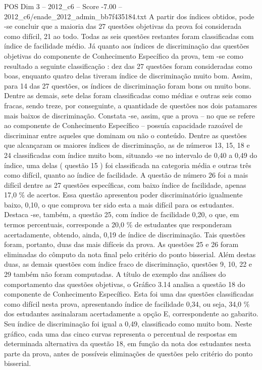 \begin{textsample}{POS Dim 3 – 2012\_c6 – Score -7.00 – 2012\_c6/enade\_2012\_admin\_bb7f435184.txt}
A partir dos índices obtidos, pode -se concluir que a maioria das 27 questões objetivas da prova foi considerada como difícil, 21 ao todo.
Todas as seis questões restantes foram classificadas com índice de facilidade médio.
Já quanto aos índices de discriminação das questões objetivas do componente de Conhecimento Específico da prova, tem -se como resultado a seguinte classificação : dez das 27 questões foram consideradas como boas, enquanto quatro delas tiveram índice de discriminação muito bom.
Assim, para 14 das 27 questões, os índices de discriminação foram bons ou muito bons.
Dentre as demais, sete delas foram classificadas como médias e outras seis como fracas, sendo treze, por conseguinte, a quantidade de questões nos dois patamares mais baixos de discriminação.
Constata -se, assim, que a prova – no que se refere ao componente de Conhecimento Específico – possuía capacidade razoável de discriminar entre aqueles que dominam ou não o conteúdo.
Dentre as questões que alcançaram os maiores índices de discriminação, as de números 13, 15, 18 e 24 classificadas com índice muito bom, situando -se no intervalo de 0,40 a 0,49 do índice, uma delas ( questão 15 ) foi classificada na categoria média e outras três como difícil, quanto ao índice de facilidade.
A questão de número 26 foi a mais difícil dentre as 27 questões específicas, com baixo índice de facilidade, apenas 17,0 \% de acertos.
Essa questão apresentou poder discriminatório igualmente baixo, 0,10, o que comprova ter sido esta a mais difícil para os estudantes.
Destaca -se, também, a questão 25, com índice de facilidade 0,20, o que, em termos percentuais, corresponde a 20,0 \% de estudantes que responderam acertadamente, obtendo, ainda, 0,19 de índice de discriminação.
Tais questões foram, portanto, duas das mais difíceis da prova.
As questões 25 e 26 foram eliminadas do cômputo da nota final pelo critério do ponto bisserial.
Além destas duas, as demais questões com índice fraco de discriminação, questões 9, 10, 22 e 29 também não foram computadas.
A título de exemplo das análises do comportamento das questões objetivas, o Gráfico 3.14 analisa a questão 18 do componente de Conhecimento Específico.
Esta foi uma das questões classificadas como difícil nesta prova, apresentando índice de facilidade 0,34, ou seja, 34,0 \% dos estudantes assinalaram acertadamente a opção E, correspondente ao gabarito.
Seu índice de discriminação foi igual a 0,49, classificado como muito bom.
Neste gráfico, cada uma das cinco curvas representa o percentual de respostas em determinada alternativa da questão 18, em função da nota dos estudantes nesta parte da prova, antes de possíveis eliminações de questões pelo critério do ponto bisserial.

\end{textsample}
